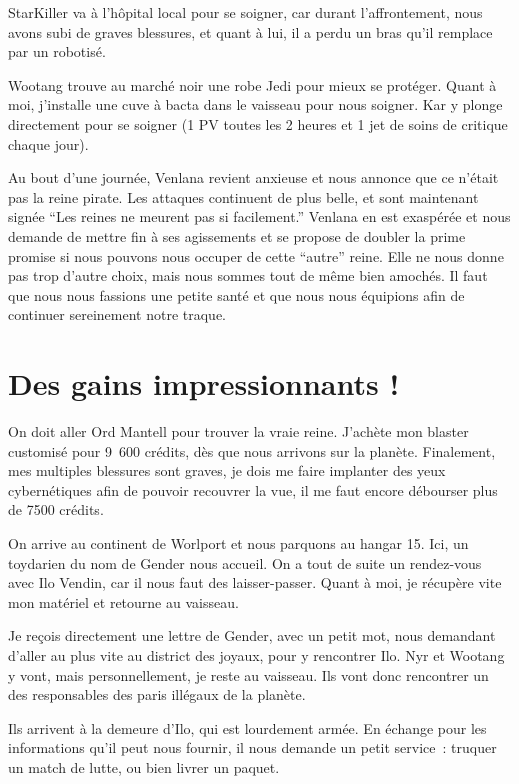 \documentclass[a4paper,9pt,twoside,twocolumn,openany]{book}
\begin{document}
StarKiller va à l’hôpital local pour se soigner, car durant l’affrontement, nous avons subi de graves blessures, et quant à lui, il a perdu un bras qu'il remplace par un robotisé.

Wootang trouve au marché noir une robe Jedi pour mieux se protéger. Quant à moi, j’installe une cuve à bacta dans le vaisseau pour nous soigner. Kar y plonge directement pour se soigner (1 PV toutes les 2 heures et 1 jet de soins de critique chaque jour).

Au bout d’une journée, Venlana revient anxieuse et nous annonce que ce n’était pas la reine pirate. Les attaques continuent de plus belle, et sont maintenant signée “Les reines ne meurent pas si facilement.” Venlana en est exaspérée et nous demande de mettre fin à ses agissements et se propose de doubler la prime promise si nous pouvons nous occuper de cette “autre” reine. Elle ne nous donne pas trop d’autre choix, mais nous sommes tout de même bien amochés. Il faut que nous nous fassions une petite santé et que nous nous équipions afin de continuer sereinement notre traque.


\section{Des gains impressionnants !}
\subtitle{17 février 2018}


On doit aller Ord Mantell pour trouver la vraie reine. J'achète mon blaster customisé pour 9\ 600 crédits, dès que nous arrivons sur la planète. Finalement, mes multiples blessures sont graves, je dois me faire implanter des yeux cybernétiques afin de pouvoir recouvrer la vue, il me faut encore débourser plus de 7500 crédits.

On arrive au continent de Worlport et nous parquons au hangar 15. Ici, un toydarien du nom de Gender nous accueil. On a tout de suite un rendez-vous avec Ilo Vendin, car il nous faut des laisser-passer. Quant à moi, je récupère vite mon matériel et retourne au vaisseau.

Je reçois directement une lettre de Gender, avec un petit mot, nous demandant d'aller au plus vite au district des joyaux, pour y rencontrer Ilo. Nyr et Wootang y vont, mais personnellement, je reste au vaisseau. Ils vont donc rencontrer un des responsables des paris illégaux de la planète.

Ils arrivent à la demeure d’Ilo, qui est lourdement armée. En échange pour les informations qu'il peut nous fournir, il nous demande un petit service~: truquer un match de lutte, ou bien livrer un paquet.
\end{document}

